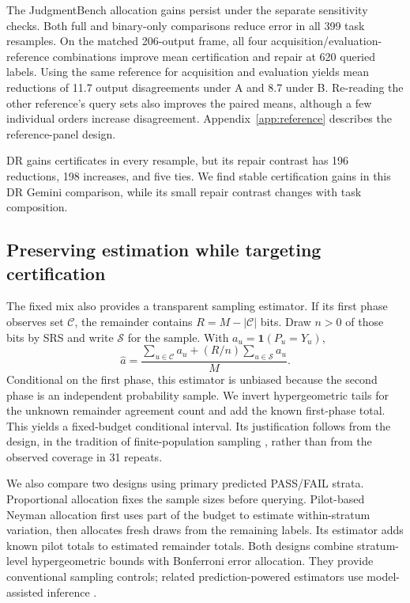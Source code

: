\documentclass[10pt,letterpaper]{article}
\newcommand{\ind}{\mathbf{1}}
\begin{document}
The JudgmentBench allocation gains persist under the separate sensitivity checks. Both full and binary-only comparisons reduce error in all 399 task resamples. On the matched 206-output frame, all four acquisition/evaluation-reference combinations improve mean certification and repair at 620 queried labels. Using the same reference for acquisition and evaluation yields mean reductions of 11.7 output disagreements under A and 8.7 under B. Re-reading the other reference's query sets also improves the paired means, although a few individual orders increase disagreement. Appendix~\ref{app:reference} describes the reference-panel design.

DR gains certificates in every resample, but its repair contrast has 196 reductions, 198 increases, and five ties. We find stable certification gains in this DR Gemini comparison, while its small repair contrast changes with task composition.

\subsection{Preserving estimation while targeting certification}
The fixed mix also provides a transparent sampling estimator. If its first phase observes set $\mathcal C$, the remainder contains $R=M-|\mathcal C|$ bits. Draw $n>0$ of those bits by SRS and write $\mathcal S$ for the sample. With $a_u=\ind(P_u=Y_u)$,
\begin{equation}\label{eq:estimator}
\widehat a=\frac{\sum_{u\in\mathcal C}a_u+(R/n)\sum_{u\in\mathcal S}a_u}{M}.
\end{equation}
Conditional on the first phase, this estimator is unbiased because the second phase is an independent probability sample. We invert hypergeometric tails for the unknown remainder agreement count and add the known first-phase total. This yields a fixed-budget conditional interval. Its justification follows from the design, in the tradition of finite-population sampling \citep{horvitz1952generalization}, rather than from the observed coverage in 31 repeats.

We also compare two designs using primary predicted PASS/FAIL strata. Proportional allocation fixes the sample sizes before querying. Pilot-based Neyman allocation first uses part of the budget to estimate within-stratum variation, then allocates fresh draws from the remaining labels. Its estimator adds known pilot totals to estimated remainder totals. Both designs combine stratum-level hypergeometric bounds with Bonferroni error allocation. They provide conventional sampling controls; related prediction-powered estimators use model-assisted inference \citep{angelopoulos2023ppi,fisch2024stratppi,kim2026humanreviews}.
\end{document}
